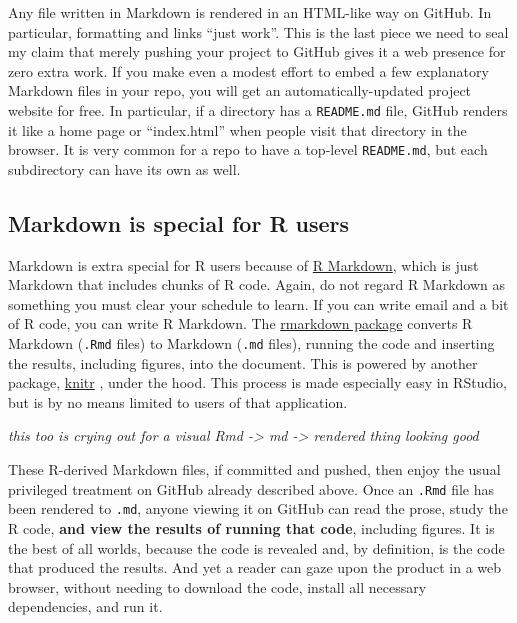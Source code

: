 \documentclass[12pt]{article}
\begin{document}
Any file written in Markdown is rendered in an HTML-like way on GitHub.
In particular, formatting and links ``just work''. This is the last
piece we need to seal my claim that merely pushing your project to
GitHub gives it a web presence for zero extra work. If you make even a
modest effort to embed a few explanatory Markdown files in your repo,
you will get an automatically-updated project website for free. In
particular, if a directory has a \texttt{README.md} file, GitHub renders
it like a home page or ``index.html'' when people visit that directory
in the browser. It is very common for a repo to have a top-level
\texttt{README.md}, but each subdirectory can have its own as well.

\subsection{Markdown is special for R
users}\label{markdown-is-special-for-r-users}

Markdown is extra special for R users because of
\href{http://rmarkdown.rstudio.com}{R Markdown}, which is just Markdown
that includes chunks of R code. Again, do not regard R Markdown as
something you must clear your schedule to learn. If you can write email
and a bit of R code, you can write R Markdown. The
\href{https://CRAN.R-project.org/package=rmarkdown}{rmarkdown package}
\citep{rmd-pkg} converts R Markdown (\texttt{.Rmd} files) to Markdown
(\texttt{.md} files), running the code and inserting the results,
including figures, into the document. This is powered by another
package, \href{https://CRAN.R-project.org/package=knitr}{knitr}
\citep{knitr-pkg, knitr-book}, under the hood. This process is made
especially easy in RStudio, but is by no means limited to users of that
application.

\emph{this too is crying out for a visual Rmd -\textgreater{} md
-\textgreater{} rendered thing looking good}

These R-derived Markdown files, if committed and pushed, then enjoy the
usual privileged treatment on GitHub already described above. Once an
\texttt{.Rmd} file has been rendered to \texttt{.md}, anyone viewing it
on GitHub can read the prose, study the R code, \textbf{and view the
results of running that code}, including figures. It is the best of all
worlds, because the code is revealed and, by definition, is the code
that produced the results. And yet a reader can gaze upon the product in
a web browser, without needing to download the code, install all
necessary dependencies, and run it.
\end{document}
